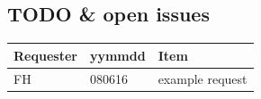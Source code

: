 \subsection{TODO \& open issues} 
\begin{tabular*}{\textwidth}{lll}
\hline
Requester & yymmdd & Item \\
\hline
FH & 080616 & example request \\
\hline
\end{tabular*}





%
%
%
%


